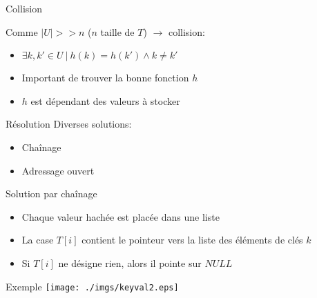 \documentclass{beamer}
\begin{document}
  \begin{frame}{Collision}

    Comme $|U| >> n$ ($n$ taille de $T$) $\rightarrow$ collision:
    \begin{itemize}
      \item{$\exists k, k' \in U\ |\ h(k) = h(k') \land k \ne k'$}
    \end{itemize}

    \begin{itemize}
      \item{Important de trouver la bonne fonction $h$}
      \item{$h$ est dépendant des valeurs à stocker}
    \end{itemize}

  \end{frame}

  \begin{frame}{Résolution}
    Diverses solutions:
    \begin{itemize}
      \item{Chaînage}
      \item{Adressage ouvert}
    \end{itemize}
    \begin{block}{Solution par chaînage}
      \begin{itemize}
        \item{Chaque valeur hachée est placée dans une liste}
        \item{La case $T[i]$ contient le pointeur vers la liste des éléments de clés $k$}
        \item{Si $T[i]$ ne désigne rien, alors il pointe sur $NULL$}
      \end{itemize}
    \end{block}
  \end{frame}

  \begin{frame}{Exemple}
    \texttt{[image: ./imgs/keyval2.eps]}
  \end{frame}
\end{document}

